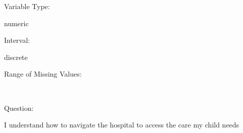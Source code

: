 \documentclass[
]{article}
\begin{document}
\begin{minipage}[t]{0.3\linewidth}

Variable Type:

\end{minipage}%
\begin{minipage}[t]{0.7\linewidth}

numeric

\end{minipage}

\begin{minipage}[t]{0.3\linewidth}

Interval:

\end{minipage}%
\begin{minipage}[t]{0.7\linewidth}

discrete

\end{minipage}

\begin{minipage}[t]{0.3\linewidth}

Range of Missing Values:

\end{minipage}%
\begin{minipage}[t]{0.7\linewidth}

~

\end{minipage}

\begin{minipage}[t]{0.3\linewidth}

Question:

\end{minipage}%
\begin{minipage}[t]{0.7\linewidth}

I understand how to navigate the hospital to access the care my child
needs

\end{minipage}
\end{document}
